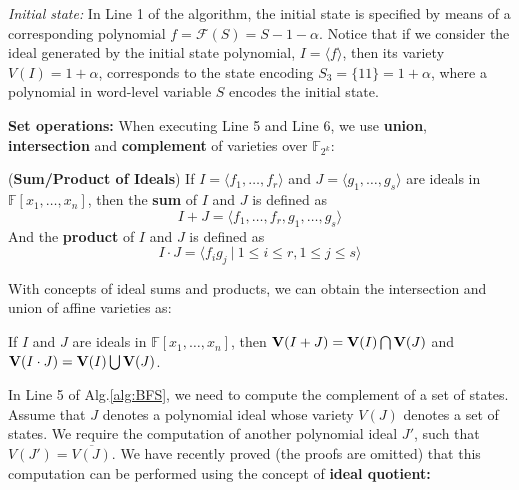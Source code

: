 {\it Initial state:} In Line 1 of the algorithm, the initial state is
specified by means of a corresponding polynomial $f = \mathcal{F}(S) =
S - 1 - \alpha$. Notice that if we consider the ideal generated by the
initial state polynomial, $I = \langle f\rangle$, then its variety
$V(I) = 1+\alpha$, corresponds to the state encoding $S_3 = \{11\} =
1+\alpha$, where a polynomial in word-level variable $S$ encodes the
initial state. 



{\bf Set operations:} When executing Line 5 and Line 6, we use
\textbf{union}, \textbf{intersection} and \textbf{complement} of
varieties over $\mathbb{F}_{2^k}$: 

\begin{Definition}
\label{def:sum}
({\bf Sum/Product of Ideals}) If $I = \langle f_1, \dots, f_r\rangle$ and $J = \langle g_1, \dots, g_s\rangle$ are 
ideals in $\mathbb F[x_1, \dots, x_n]$, then the {\bf sum} of $I$ and $J$ is defined as
$$I + J = \langle f_1, \dots, f_r, g_1, \dots, g_s\rangle$$ And the {\bf product} of $I$ and $J$ is defined
as
\begin{equation}
  I \cdot J = \langle f_ig_j\ |\ 1 \leq i \leq r, 1 \leq j \leq s\rangle \nonumber
  \end{equation}
\end{Definition}

With concepts of ideal sums and products, we can obtain the
intersection and union of affine varieties as:
\begin{Theorem}
\label{thm:unionintersect}
If $I$ and $J$ are ideals in $\mathbb F[x_1, \dots, x_n]$, then ${\bf
  V}(I + J) = {\bf V}(I) \bigcap {\bf V}(J)$ and ${\bf V}(I \cdot J) =
{\bf V}(I) \bigcup {\bf V}(J)$. 
\end{Theorem}


In Line 5 of Alg.\ref{alg:BFS}, we need to compute the complement of a
set of states. Assume that $J$ denotes a polynomial ideal whose
variety $V(J)$ denotes a set of states. We require the computation of
another polynomial ideal $J'$, such that $V(J') =
\overline{V(J)}$. We have recently proved (the proofs are omitted)
that this computation can be performed using the concept of {\bf ideal
  quotient:} 

